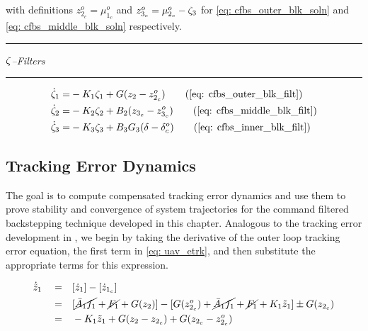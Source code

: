 \documentclass[12pt]{ucthesis}
\begin{document}
with definitions $z^o_{2_c} = \mu^o_{1_c}$ and $z^o_{3_c} = \mu^o_{2_c} - \zeta_3$ for \ref{eq: cfbs_outer_blk_soln}  and \ref{eq: cfbs_middle_blk_soln} respectively.
%
\begin{center} {\color{lightgray}\rule[2pt]{2.8in}{1pt}} \noindent \textit{$\zeta$--Filters} {\color{lightgray}\rule[2pt]{2.8in}{1pt}} \end{center}%
\vspace{-2em}
	\begin{align}%
		\dot{\filt}_1 =& -K_1 \filt_1 + G(z_2 - z^o_{2_c})			\tag{\ref{eq: cfbs_outer_blk_filt}}   \\%
		\dot{\filt}_2 =& -K_2 \filt_2 + B_2(z_{3_c} - z^o_{3_c}) 	\tag{\ref{eq: cfbs_middle_blk_filt}}  \\%
		\dot{\filt}_3 =& -K_3 \filt_3 + B_3 G_3(\delta - \delta^o_{c})	\tag{\ref{eq: cfbs_inner_blk_filt}}%
	\end{align}%
%
\subsection{Tracking Error Dynamics}
\label{subsec: uav_etrk_dyn}
%
The goal is to compute compensated tracking error dynamics and use them to prove stability and convergence of system trajectories for the command filtered backstepping technique developed in this chapter. Analogous to the tracking error development in , we begin by taking the derivative of the outer loop tracking error equation, the first term in \autoref{eq: uav_etrk}, and then substitute the appropriate terms for this expression.%
\begin{fleqn} %
\begin{align} \label{eq: uav_etrk_1_dot}%
\dot{\tilde{z}}_1 	\quad =& \quad [\dot{z}_1] - [\dot{z}_{1_c}] \nonumber \\
					\quad =& \quad [\cancel{\bar{A}_1 f_1} + \cancel{F_1} + G(z_2)] - [G(z^o_{2_{c}}) + \cancel{\bar{A}_1 f_1} + \cancel{F_1} + K_1 \tilde{z}_1] \pm G(z_{2_{c}}) \nonumber \\
					\quad =& \quad -K_1 \tilde{z}_1 + G(z_2 - z_{2_c}) + G(z_{2_c}-z^o_{2_{c}})
\end{align}%
\end{fleqn}%
\end{document}
